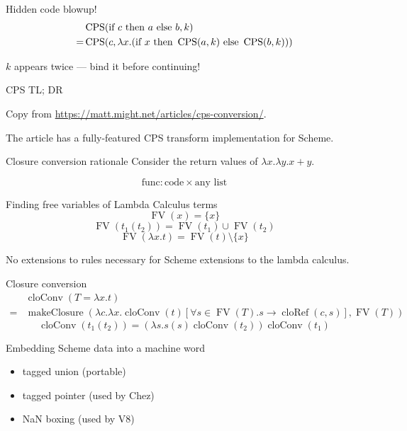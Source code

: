 \documentclass{beamer}
\begin{document}
\begin{frame}[fragile]{Hidden code blowup!}
  \[\begin{aligned}
    &\operatorname{CPS}(\text{if }c\text{ then }a\text{ else }b, k)\\
    =&\operatorname{CPS}(c, \lambda x.(\text{if }x\text{ then }\operatorname{CPS}(a,k)\text{ else }\operatorname{CPS}(b,k)))
  \end{aligned}\]

$k$ appears twice --- bind it before continuing!
\end{frame}

\begin{frame}{CPS TL; DR}
  \begin{center}
    Copy from \url{https://matt.might.net/articles/cps-conversion/}.
  \end{center}
  The article has a fully-featured CPS transform implementation for Scheme.
\end{frame}

\begin{frame}{Closure conversion rationale}
  Consider the return values of $\lambda x.\lambda y.x+y$.

  \[\text{func}: \text{code}\times\text{any list}\]
\end{frame}

\newcommand{\FV}{\operatorname{FV}}
\begin{frame}{Finding free variables of Lambda Calculus terms}
  \[\FV(x)=\{x\}\]
  \[\FV(t_1(t_2))=\FV(t_1)\cup\FV(t_2)\]
  \[\FV(\lambda x.t)=\FV(t)\setminus\{x\}\]

  No extensions to rules necessary for Scheme extensions to the lambda calculus.
\end{frame}

\newcommand{\cloConv}{\operatorname{cloConv}}
\newcommand{\makeClosure}{\operatorname{makeClosure}}
\begin{frame}{Closure conversion}
  \[
    \begin{aligned}
      &\cloConv(T=\lambda x.t)\\
      =&\makeClosure(\lambda c.\lambda x.\cloConv(t)[\forall s\in\FV(T).s\to\operatorname{cloRef}(c, s)], \FV(T))
    \end{aligned}
  \]
  \[
    \cloConv(t_1(t_2))=(\lambda s. s (s) \cloConv(t_2))\cloConv(t_1)
  \]
\end{frame}

\begin{frame}{Embedding Scheme data into a machine word}
  \begin{itemize}
  \item tagged union (portable)
  \item tagged pointer (used by Chez)
  \item NaN boxing (used by V8)
  \end{itemize}
\end{frame}
\end{document}
